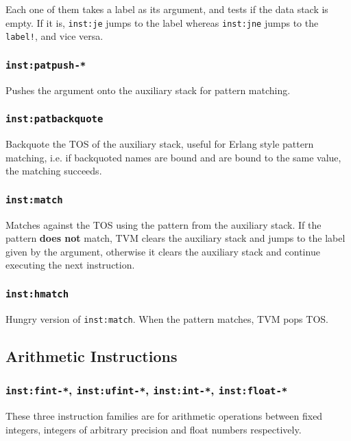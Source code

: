\documentclass{article}
\newcommand{\inst}[1] {\texttt{inst:#1}}
\begin{document}
Each one of them takes a label as its argument, and tests if the data stack is empty. If it is, \inst{je} jumps to the label whereas \inst{jne} jumps to the \texttt{label!}, and vice versa.

\subsubsection{\inst{patpush-*}}

Pushes the argument onto the auxiliary stack for pattern matching.

\subsubsection{\inst{patbackquote}}

Backquote the TOS of the auxiliary stack, useful for Erlang style pattern matching, i.e. if backquoted names are bound and are bound to the same value, the matching succeeds.

\subsubsection{\inst{match}}

Matches against the TOS using the pattern from the auxiliary stack. If the pattern \textbf{does not} match, TVM clears the auxiliary stack and jumps to the label given by the argument, otherwise it clears the auxiliary stack and continue executing the next instruction.

\subsubsection{\inst{hmatch}}

Hungry version of \inst{match}. When the pattern matches, TVM pops TOS.

\subsection{Arithmetic Instructions}

\subsubsection{\inst{fint-*}, \inst{ufint-*}, \inst{int-*}, \inst{float-*}}

These three instruction families are for arithmetic operations between fixed integers, integers of arbitrary precision and float numbers respectively.
\end{document}
